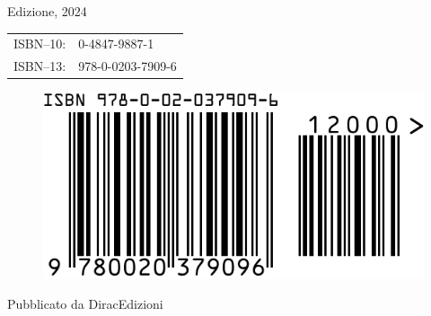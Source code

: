 {\begin{flushright}
		\bigskip
		
		\textonesuperior Edizione, 2024
		
		\bigskip
		
		\begin{tabular}{rl}
			ISBN--10:& 0-4847-9887-1\\ 
			ISBN--13:& 978-0-0203-7909-6\\ 
		\end{tabular}	
		
		\bigskip
		
		\begin{figure}[h]
			\begin{flushright}
				\includegraphics[width=0.3\linewidth]{Immagini/barcode_978-0-02-037909-6}
			\end{flushright}
		\end{figure}
		
		Pubblicato da DiracEdizioni 
		
\end{flushright}
}
 
